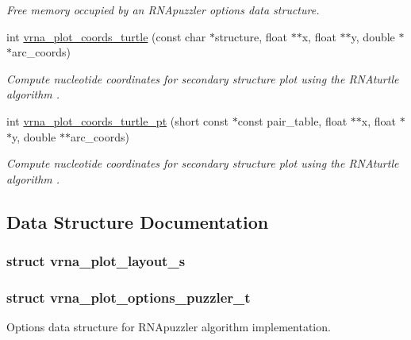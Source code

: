 \begin{DoxyCompactItemize}
\begin{DoxyCompactList}\small\item\em Free memory occupied by an R\+N\+Apuzzler options data structure. \end{DoxyCompactList}\item 
int \mbox{\hyperlink{group__plot__layout__utils_ga195139110e2877b92c7f82d05b6dad19}{vrna\+\_\+plot\+\_\+coords\+\_\+turtle}} (const char $\ast$structure, float $\ast$$\ast$x, float $\ast$$\ast$y, double $\ast$$\ast$arc\+\_\+coords)
\begin{DoxyCompactList}\small\item\em Compute nucleotide coordinates for secondary structure plot using the {\itshape R\+N\+Aturtle} algorithm \cite{wiegreffe:2018}. \end{DoxyCompactList}\item 
int \mbox{\hyperlink{group__plot__layout__utils_ga3d3531ebbca9054240c73bff115c4dcf}{vrna\+\_\+plot\+\_\+coords\+\_\+turtle\+\_\+pt}} (short const $\ast$const pair\+\_\+table, float $\ast$$\ast$x, float $\ast$$\ast$y, double $\ast$$\ast$arc\+\_\+coords)
\begin{DoxyCompactList}\small\item\em Compute nucleotide coordinates for secondary structure plot using the {\itshape R\+N\+Aturtle} algorithm \cite{wiegreffe:2018}. \end{DoxyCompactList}\end{DoxyCompactItemize}


\subsection{Data Structure Documentation}
\label{structvrna__plot__layout__s}
\subsubsection{struct vrna\+\_\+plot\+\_\+layout\+\_\+s}
\label{structvrna__plot__options__puzzler__t}
\subsubsection{struct vrna\+\_\+plot\+\_\+options\+\_\+puzzler\+\_\+t}
Options data structure for R\+N\+Apuzzler algorithm implementation. 

